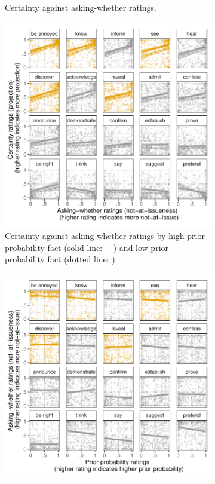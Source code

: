 \documentclass[11pt,fleqn]{article}
\newcommand{\6}{\mbox{$[\hspace*{-.6mm}[$}}
\newcommand{\9}{\mbox{$]\hspace*{-.6mm}]$}}
\begin{document}
\begin{figure}[h!]
\begin{subfigure}[t]{0.49\textwidth}
\caption{Certainty against asking-whether ratings.}\label{fig:certainty-by-nai}
 \end{subfigure}
 
\begin{subfigure}[t]{0.49\textwidth}
\centering
\includegraphics[width=\textwidth]{../../results/exp1/graphs/projection-by-ai-and-prior}
\caption{Certainty against asking-whether ratings by high prior probability fact (solid line: ---) and low prior probability fact (dotted line: \raisebox{1mm}{\ldots}).}\label{fig:certainty-by-ai-and-prior}
 \end{subfigure}\hfill 
\begin{subfigure}[t]{0.49\textwidth}
\centering
\includegraphics[width=\textwidth]{../../results/exp1/graphs/ai-by-prior}

\end{subfigure}
\end{figure}
\end{document}
